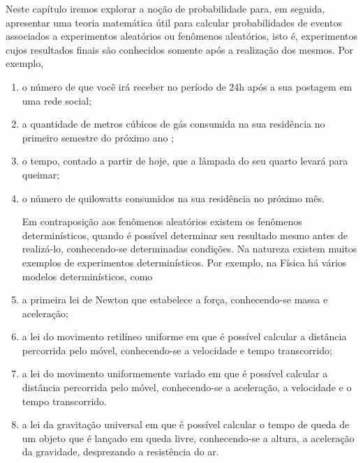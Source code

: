 \clearpage



\label{\detokenize{PE511:probabilidade}}\label{\detokenize{PE511::doc}}

\label{\detokenize{PE511-0::doc}}\label{\detokenize{PE511-0:explorando-probabilidade-conceitos-basicos}}\label{\detokenize{PE511-0:sec-conceitos-basicos}}
Neste capítulo iremos explorar a noção de probabilidade para, em seguida,  apresentar uma teoria matemática útil para calcular probabilidades de eventos associados a experimentos aleatórios ou fenômenos aleatórios, isto é, experimentos cujos resultados finais são conhecidos somente após a realização dos mesmos.
Por exemplo,
\begin{enumerate}
\item {} 
o número de  que você irá receber no período de 24h após a sua postagem em uma rede social;

\item {} 
a quantidade de metros cúbicos de gás consumida na sua residência no primeiro semestre do próximo ano ;

\item {} 
o tempo, contado a partir de hoje, que a lâmpada do seu quarto levará para queimar;

\item {} 
o número de quilowatts consumidos na sua residência no próximo mês.

Em contraposição aos fenômenos aleatórios existem os fenômenos determinísticos, quando é possível determinar seu resultado mesmo antes de realizá-lo, conhecendo-se determinadas condições. Na natureza existem muitos exemplos de experimentos determinísticos. Por exemplo, na Física há vários modelos determinísticos, como

\item {} 
a primeira lei de Newton que estabelece a força, conhecendo-se massa e aceleração;

\item {} 
a lei do movimento retilíneo uniforme em que é possível calcular a distância percorrida pelo móvel, conhecendo-se a velocidade e tempo transcorrido;

\item {} 
a lei do movimento uniformemente variado em que é possível calcular a distância percorrida pelo móvel, conhecendo-se a aceleração, a velocidade e o tempo transcorrido.

\item {} 
a lei da gravitação universal em que é possível calcular o tempo de queda de um objeto que é lançado em queda livre, conhecendo-se a altura, a aceleração da gravidade, desprezando a resistência do ar.

\end{enumerate}

